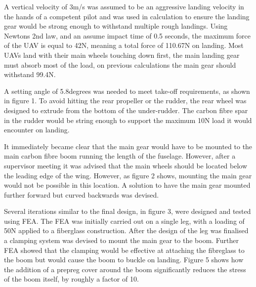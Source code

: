 \documentclass[../../main.tex]{subfiles}
\begin{document}
A vertical velocity of 3m/s was assumed to be an aggressive landing velocity in the hands of a competent pilot and was used in calculation to ensure the landing gear would be strong enough to withstand multiple rough landings.
Using Newtons 2nd law, and an assume impact time of 0.5 seconds, the maximum force of the UAV is equal to 42N, meaning a total force of 110.67N on landing.
Most UAVs land with their main wheels touching down first, the main landing gear must absorb most of the load, on previous calculations the main gear should withstand 99.4N.  


A setting angle of 5.8degrees was needed to meet take-off requirements, as shown in figure 1.
To avoid hitting the rear propeller or the rudder, the rear wheel was designed to extrude from the bottom of the under-rudder.
The carbon fibre spar in the rudder would be string enough to support the maximum 10N load it would encounter on landing. 


It immediately became clear that the main gear would have to be mounted to the main carbon fibre boom running the length of the fuselage.
However, after a supervisor meeting it was advised that the main wheels should be located below the leading edge of the wing.
However, as figure 2 shows, mounting the main gear would not be possible in this location.
A solution to have the main gear mounted further forward but curved backwards was devised.  

Several iterations similar to the final design, in figure 3, were designed and tested using FEA.
The FEA was initially carried out on a single leg, with a loading of 50N applied to a fiberglass construction.
After the design of the leg was finalised a clamping system was devised to mount the main gear to the boom.
Further FEA showed that the clamping would be effective at attaching the fibreglass to the boom but would cause the boom to buckle on landing.
Figure 5 shows how the addition of a prepreg cover around the boom significantly reduces the stress of the boom itself, by roughly a factor of 10. 

\end{document}
